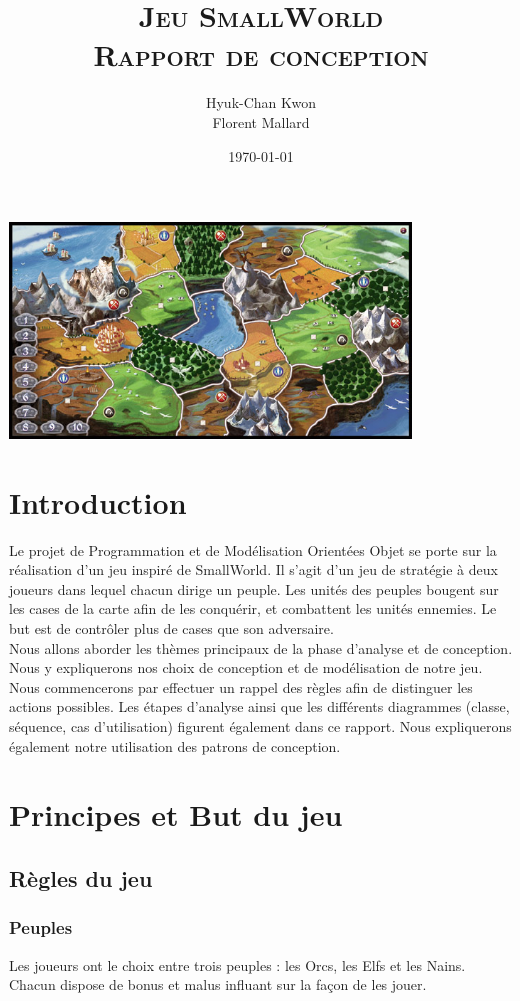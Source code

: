 \documentclass[a4paper]{article}
\title{
\textsc{Jeu SmallWorld\\
\LARGE Rapport de conception}
}
\author
{
	Hyuk-Chan {\sc Kwon}\\
    Florent {\sc Mallard}\\
}
\date{\today}
\begin{document}
\maketitle
\begin{center}
\includegraphics[width=0.8\textwidth]{./smallworld.jpg}~\\[5cm]
\end{center}

\newpage
\tableofcontents
\newpage


\section*{Introduction}
Le projet de Programmation et de Modélisation Orientées Objet se porte sur la réalisation d'un jeu inspiré de SmallWorld. Il s'agit d'un jeu de stratégie à deux joueurs dans lequel chacun dirige un peuple. Les unités des peuples bougent sur les cases de la carte afin de les conquérir, et combattent les unités ennemies. Le but est de contrôler plus de cases que son adversaire.\\
Nous allons aborder les thèmes principaux de la phase d'analyse et de conception.
Nous y expliquerons nos choix de conception  et de modélisation de notre jeu. Nous commencerons par effectuer un rappel des règles afin de distinguer les actions possibles.
Les étapes d'analyse ainsi que les différents diagrammes (classe, séquence, cas d'utilisation) figurent également dans ce rapport.
Nous expliquerons également notre utilisation des patrons de conception.

\section{Principes et But du jeu}
	\subsection{Règles du jeu}
		\subsubsection{Peuples}
Les joueurs ont le choix entre trois peuples : les Orcs, les Elfs et les Nains. Chacun dispose de bonus et malus influant sur la façon de les jouer.
\end{document}
